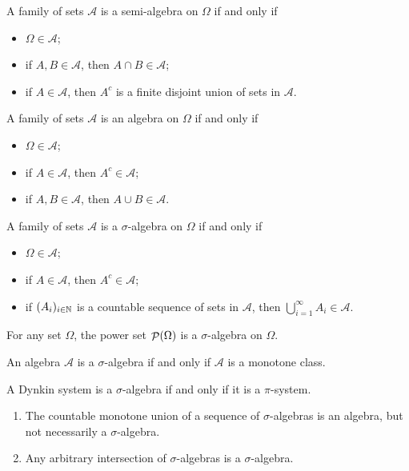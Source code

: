\begin{lemma} \label{setAlgebraCriteria}
A family of sets $\mathcal{A}$ is a semi-algebra on $\Omega$ \textup{if and only if}
\begin{itemize}
\item $\Omega\in\mathcal{A}$;
\item if $A,B\in \mathcal{A}$, then $A\cap B\in \mathcal{A}$;
\item if $A\in \mathcal{A}$, then $A^c$ is a finite disjoint union of sets in $\mathcal{A}$.
\end{itemize}
A family of sets $\mathcal{A}$ is an algebra on $\Omega$ \textup{if and only if}
\begin{itemize}
\item $\Omega\in\mathcal{A}$;
\item if $A\in \mathcal{A}$, then $A^c\in \mathcal{A}$;
\item if $A,B\in \mathcal{A}$, then $A\cup B\in \mathcal{A}$.
\end{itemize}
A family of sets $\mathcal{A}$ is a $\sigma$-algebra on $\Omega$ \textup{if and only if}
\begin{itemize}
\item $\Omega\in\mathcal{A}$;
\item if $A\in \mathcal{A}$, then $A^c\in \mathcal{A}$;
\item if $(A_i)_{i\in\mathbb{N}}$ is a countable sequence of sets in $\mathcal{A}$, then $\bigcup_{i=1}^\infty A_i\in \mathcal{A}$.
\end{itemize}
\end{lemma}

\begin{example}
For any set $\Omega$, the power set $\mathop{\mathcal{P}}(\Omega)$ is a $\sigma$-algebra on $\Omega$.
\end{example}

\begin{lemma} \label{algebraMonotoneClass}
An algebra $\mathcal{A}$ is a $\sigma$-algebra \textup{if and only if} $\mathcal{A}$ is a monotone class.
\end{lemma}
\begin{lemma} \label{DynkinPiSystem}
A Dynkin system is a $\sigma$-algebra \textup{if and only if} it is a $\pi$-system.
\end{lemma}


\begin{lemma}
\begin{enumerate}
\item The countable monotone union of a sequence of $\sigma$-algebras is an algebra, but not necessarily a $\sigma$-algebra.
\item Any arbitrary intersection of $\sigma$-algebras is a $\sigma$-algebra.
\end{enumerate}
\end{lemma}

